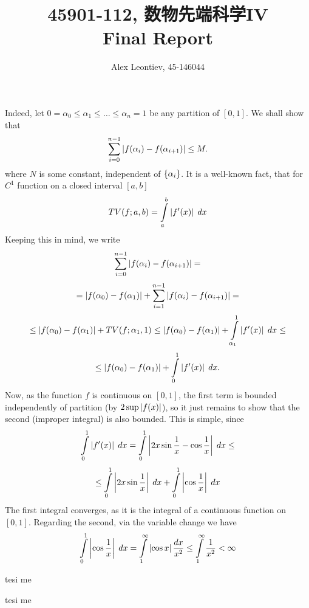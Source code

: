 \documentclass[10pt]{article} %
\title{45901-112, 数物先端科学IV\\Final Report}
\author{Alex Leontiev, 45-146044}
\begin{document}
\begin{CJK}{UTF8}{bsmi}
\maketitle
\end{CJK}
\begin{enumerate}[\bf{[}1{]}]
	\item Indeed, let $0=\alpha_0\leq\alpha_1\leq\hdots\leq\alpha_n=1$ be any partition of $[0,1]$. We shall show that
		\[\sum_{i=0}^{n-1}\myabs{f(\alpha_i)-f(\alpha_{i+1})}\leq M.\]
		where $N$ is some constant, independent of $\left\{\alpha_i\right\}$. It is a well-known fact, that for $C^1$ function
		on a closed interval $[a,b]$
		\[TV(f;a,b)=\int_a^b\myabs{f'(x)}\;dx\]
		Keeping this in mind, we write
		\[\sum_{i=0}^{n-1}\myabs{f(\alpha_i)-f(\alpha_{i+1})}=\]
		\[=\myabs{f(\alpha_0)-f(\alpha_1)}+\sum_{i=1}^{n-1}\myabs{f(\alpha_i)-f(\alpha_{i+1})}=\]
		\[\leq\myabs{f(\alpha_0)-f(\alpha_1)}+TV(f;\alpha_1,1)
		\leq\myabs{f(\alpha_0)-f(\alpha_1)}+\int_{\alpha_1}^1\myabs{f'(x)}\;dx\leq\]
		\[\leq\myabs{f(\alpha_0)-f(\alpha_1)}+\int_0^1\myabs{f'(x)}\;dx.\]
		Now, as the function $f$ is continuous on $[0,1]$, the first term is bounded independently of partition (by $2\sup
		\myabs{f(x)}$), so it just remains to show that the second (improper integral) is also bounded. This is simple, since
		\[\int_0^1\myabs{f'(x)}\;dx=\int_0^1\myabs{2x\sin\frac{1}{x}-\cos\frac{1}{x}}\;dx\leq\]
		\[\leq\int_0^1\myabs{2x\sin\frac{1}{x}}\;dx+\int_0^1\myabs{\cos\frac{1}{x}}\;dx\]
		The first integral converges, as it is the integral of a continuous function on $[0,1]$. Regarding the second,
		via the variable change we have
		\[\int_0^1\myabs{\cos\frac{1}{x}}\;dx=\int_1^{\infty}\myabs{\cos x}\frac{dx}{x^2}\leq\int_1^{\infty}\frac{1}{x^2}
		<\infty\]
	\item tesi me %
		\setcounter{enumi}{5}
	\item tesi me
\end{enumerate}
\end{document}
